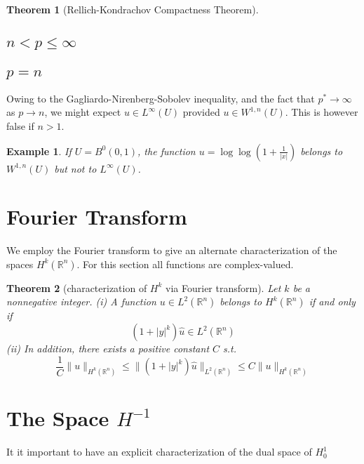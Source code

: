 \documentclass{article}
\newtheorem{theorem}{Theorem}[section]
\newtheorem{example}{Example}[section]
\theoremstyle{definition}
\begin{document}
\begin{theorem}[Rellich-Kondrachov Compactness Theorem]
    
\end{theorem}


\subsection{$n<p\le\infty$}



\subsection{$p=n$}
Owing to the Gagliardo-Nirenberg-Sobolev inequality, and the fact that $p^*\to\infty$ as $p\to n$, we might expect $u\in L^\infty(U)$ provided 
$u\in W^{1,n}(U)$. This is however false if $n>1$.
\begin{example}
    If $U=B^0(0,1)$, the function $u=\log\log (1+\frac{1}{|x|})$ belongs to $W^{1,n}(U)$ but not to $L^\infty(U)$.
\end{example}

\section{Fourier Transform}
We employ the Fourier transform to give an alternate characterization of the spaces $H^k(\mathbb{R}^n)$.
For this section all functions are complex-valued.
\begin{theorem}[characterization of $H^k$ via Fourier transform]
    Let $k$ be a nonnegative integer.\newline 
    (i) A function $u\in L^2(\mathbb{R}^n)$ belongs to $H^k(\mathbb{R}^n)$ if and only if 
    \[ (1+|y|^k)\hat{u}\in L^2(\mathbb{R}^n)\] 
    (ii) In addition, there exists a positive constant $C$ s.t. 
    \[ \frac{1}{C}\|u\|_{H^k(\mathbb{R}^n)}\le \| (1+|y|^k)\hat{u}\|_{L^2(\mathbb{R}^n)}\le C\|u\|_{H^k(\mathbb{R}^n)} \]
\end{theorem}


\section{The Space $H^{-1}$}
It it important to have an explicit characterization of the dual space of $H^1_0$
\end{document}
